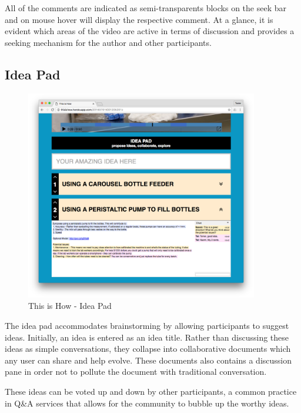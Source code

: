 
All of the comments are indicated as semi-transparents blocks on the seek bar and on mouse hover will display the respective comment. At a glance, it is evident which areas of the video are active in terms of discussion and provides a seeking mechanism for the author and other participants.  

\subsection{Idea Pad}

   \begin{figure}[thpb]
      \centering
      \includegraphics[width=4in]{figures/ideapad-collapsed.png}
      \caption{This is How - Idea Pad}
      \label{fig_comment_thread}
   \end{figure}

The idea pad accommodates brainstorming by allowing participants to suggest ideas. Initially, an idea is entered as an idea title. Rather than discussing these ideas as simple conversations, they collapse into collaborative documents which any user can share and help evolve. These documents also contains a discussion pane in order not to pollute the document with traditional conversation. 

These ideas can be voted up and down by other participants, a common practice in Q\&A services\cite{stackoverflow}\cite{quora} that allows for the community to bubble up the worthy ideas.   